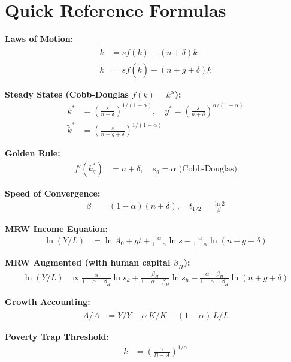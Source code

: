 \documentclass[a4paper,11pt]{article}
\newcommand{\ktilde}{\tilde{k}}
\begin{document}
\section{Quick Reference Formulas}

\begin{keyformulabox}[title={Quick Reference: Solow Model}]
\textbf{Laws of Motion:}
\begin{align*}
\dot{k} &= sf(k) - (n+\delta)k \tag{per worker} \\
\dot{\ktilde} &= sf(\ktilde) - (n+g+\delta)\ktilde \tag{per eff.\ worker}
\end{align*}

\textbf{Steady States (Cobb-Douglas $f(k)=k^\alpha$):}
\begin{align*}
k^* &= \left(\tfrac{s}{n+\delta}\right)^{1/(1-\alpha)}, \quad
y^* = \left(\tfrac{s}{n+\delta}\right)^{\alpha/(1-\alpha)} \\
\ktilde^* &= \left(\tfrac{s}{n+g+\delta}\right)^{1/(1-\alpha)}
\end{align*}

\textbf{Golden Rule:}
\begin{align*}
f'(k_g^*) &= n+\delta, \quad s_g = \alpha \text{ (Cobb-Douglas)}
\end{align*}

\textbf{Speed of Convergence:}
\begin{align*}
\beta &= (1-\alpha)(n+\delta), \quad t_{1/2} = \frac{\ln 2}{\beta}
\end{align*}

\textbf{MRW Income Equation:}
\begin{align*}
\ln(Y/L) &= \ln A_0 + gt + \frac{\alpha}{1-\alpha}\ln s - \frac{\alpha}{1-\alpha}\ln(n+g+\delta)
\end{align*}

\textbf{MRW Augmented (with human capital $\beta_H$):}
\begin{align*}
\ln(Y/L) &\propto \frac{\alpha}{1-\alpha-\beta_H}\ln s_k + \frac{\beta_H}{1-\alpha-\beta_H}\ln s_h - \frac{\alpha+\beta_H}{1-\alpha-\beta_H}\ln(n+g+\delta)
\end{align*}

\textbf{Growth Accounting:}
\begin{align*}
\dot{A}/A &= \dot{Y}/Y - \alpha\,\dot{K}/K - (1-\alpha)\,\dot{L}/L
\end{align*}

\textbf{Poverty Trap Threshold:}
\begin{align*}
\ktilde &= \left(\frac{\gamma}{B-A}\right)^{1/\alpha}
\end{align*}
\end{keyformulabox}
\end{document}
